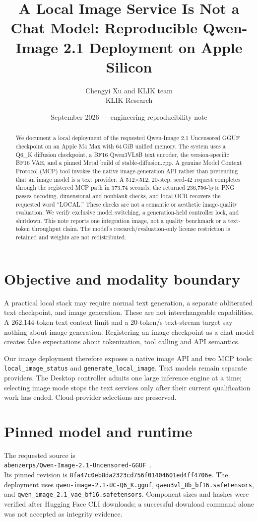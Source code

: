 \documentclass[11pt]{article}
\title{\textbf{A Local Image Service Is Not a Chat Model: Reproducible Qwen-Image 2.1 Deployment on Apple Silicon}}
\author{Chengyi Xu and KLIK team\\\small KLIK Research}
\date{September 2026 --- engineering reproducibility note}
\begin{document}
\maketitle
\begin{abstract}
We document a local deployment of the requested Qwen-Image 2.1 Uncensored GGUF checkpoint on an Apple M4 Max with 64\,GiB unified memory. The system uses a Q6\_K diffusion checkpoint, a BF16 Qwen3VL8B text encoder, the version-specific BF16 VAE, and a pinned Metal build of stable-diffusion.cpp. A genuine Model Context Protocol (MCP) tool invokes the native image-generation API rather than pretending that an image model is a text provider. A 512$\times$512, 20-step, seed-42 request completes through the registered MCP path in 373.74 seconds; the returned 236,756-byte PNG passes decoding, dimensional and nonblank checks, and local OCR recovers the requested word ``LOCAL.'' These checks are not a semantic or aesthetic image-quality evaluation. We verify exclusive model switching, a generation-held controller lock, and shutdown. This note reports one integration image, not a quality benchmark or a text-token throughput claim. The model's research/evaluation-only license restriction is retained and weights are not redistributed.
\end{abstract}

\section{Objective and modality boundary}
A practical local stack may require normal text generation, a separate abliterated text checkpoint, and image generation. These are not interchangeable capabilities. A 262,144-token text context limit and a 20-token/s text-stream target say nothing about image generation. Registering an image checkpoint as a chat model creates false expectations about tokenization, tool calling and API semantics.

Our image deployment therefore exposes a native image API and two MCP tools:\\
\texttt{local\_image\_status} and \texttt{generate\_local\_image}. Text models remain separate providers. The Desktop controller admits one large inference engine at a time; selecting image mode stops the text services only after their current qualification work has ended. Cloud-provider selections are preserved.

\section{Pinned model and runtime}
The requested source is\\
\nolinkurl{abenzerps/Qwen-Image-2.1-Uncensored-GGUF}~\cite{checkpoint}.\\
Its pinned revision is \texttt{8fa47c0eb8da2323cd756f01404601ed4ff4706e}. The deployment uses \nolinkurl{qwen-image-2.1-UC-Q6_K.gguf}, \nolinkurl{qwen3vl_8b_bf16.safetensors}, and \nolinkurl{qwen_image_2.1_vae_bf16.safetensors}. Component sizes and hashes were verified after Hugging Face CLI downloads; a successful download command alone was not accepted as integrity evidence.
\end{document}
